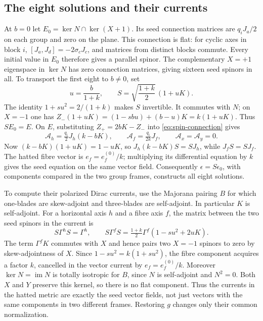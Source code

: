 \subsection{The eight solutions and their currents}
At $b=0$ let $E_0=\ker N\cap\ker(X+1)$. Its seed connection matrices
are $q_iJ_a/2$ on each group and zero on the plane. This connection is
flat: for cyclic axes in block $i$, $[J_a,J_d]=-2\sigma_c J_c$, and
matrices from distinct blocks commute. Every initial value in $E_0$
therefore gives a parallel spinor. The complementary $X=+1$ eigenspace
in $\ker N$ has zero connection matrices, giving sixteen seed spinors in
all. To transport the first eight to $b\ne0$, set
\begin{equation}\label{eq:spin-intertwiner}
 u=\frac{b}{1+k},\qquad S=\sqrt{\frac{1+k}{2}}\,(1+uK).
\end{equation}
The identity $1+su^2=2/(1+k)$ makes $S$ invertible. It commutes with $N$;
on $X=-1$ one has $Z_-(1+uK)=(1-sbu)+(b-u)K=k(1+uK)$.
Thus $S E_0=E$. On $E$, substituting $Z_+=2bK-Z_-$ into
\eqref{eq:spin-connection} gives
\[
 \mathcal A_h=\tfrac{q_i}{2}J_h(k-bK),\qquad
 \mathcal A_f=\tfrac{q_i}{2k}J_f,\qquad \mathcal A_x=\mathcal A_y=0 .
\]
Now $(k-bK)(1+uK)=1-uK$, so $J_h(k-bK)S=SJ_h$, while $J_fS=SJ_f$.
The hatted fibre vector is $e_f=e_f^{(0)}/k$; multiplying its differential
equation by $k$ gives the seed equation on the same vector field.
Consequently $\epsilon=S\epsilon_0$, with components compared in the two
group frames, constructs all eight solutions.

To compute their polarized Dirac currents, use the Majorana pairing $B$
for which one-blades are skew-adjoint and three-blades are self-adjoint.
In particular $K$ is self-adjoint. For a horizontal axis $h$ and a fibre
axis $f$, the matrix between the two seed spinors in the current is
\[
 S\Gamma^h S=\Gamma^h,\qquad
 S\Gamma^f S=\tfrac{1+k}{2}\Gamma^f(1-su^2+2uK).
\]
The term $\Gamma^f K$ commutes with $X$ and hence pairs two $X=-1$ spinors
to zero by skew-adjointness of $X$. Since $1-su^2=k(1+su^2)$, the fibre
component acquires a factor $k$, cancelled in the vector current by
$e_f=e_f^{(0)}/k$. Moreover $\ker N=\operatorname{im}N$ is totally
isotropic for $B$, since $N$ is self-adjoint and $N^2=0$. Both $X$ and
$Y$ preserve this kernel, so there is no flat component. Thus the currents
in the hatted metric are exactly the seed vector fields, not just vectors
with the same components in two different frames. Restoring $g$ changes
only their common normalization.

